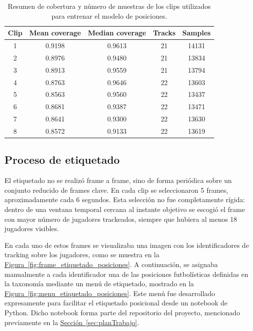 \begin{table}[H]
\centering
\scriptsize
\begin{tabular}{c|c|c|c|c}
\textbf{Clip} & \textbf{Mean coverage} & \textbf{Median coverage} & \textbf{Tracks} & \textbf{Samples} \\
\hline\hline
1 & 0.9198 & 0.9613 & 21 & 14131 \\
\hline
2 & 0.8976 & 0.9480 & 21 & 13834 \\
\hline
3 & 0.8913 & 0.9559 & 21 & 13794 \\
\hline
4 & 0.8763 & 0.9646 & 22 & 13603 \\
\hline
5 & 0.8563 & 0.9560 & 22 & 13437 \\
\hline
6 & 0.8681 & 0.9387 & 22 & 13471 \\
\hline
7 & 0.8641 & 0.9300 & 22 & 13630 \\
\hline
8 & 0.8572 & 0.9133 & 22 & 13619 \\
\hline
\end{tabular}
\caption[Resumen cobertura de clips utilizados]{Resumen de cobertura y número de muestras de los clips utilizados para entrenar el modelo de posiciones.}
\label{tab:position_dataset_clips}
\end{table}

\subsection{Proceso de etiquetado}
\label{subsec:etiquetado-inferencia-posicional}

El etiquetado no se realizó frame a frame, sino de forma periódica sobre un conjunto reducido de frames clave. En cada clip se seleccionaron 5 frames, aproximadamente cada 6 segundos. Esta selección no fue completamente rígida: dentro de una ventana temporal cercana al instante objetivo se escogió el frame con mayor número de jugadores trackeados, siempre que hubiera al menos 18 jugadores visibles.

En cada uno de estos frames se visualizaba una imagen con los identificadores de tracking sobre los jugadores, como se muestra en la \hyperref[fig:frame_etiquetado_posiciones]{Figura~\ref*{fig:frame_etiquetado_posiciones}}. A continuación, se asignaba manualmente a cada identificador una de las posiciones futbolísticas definidas en la taxonomía mediante un menú de etiquetado, mostrado en la \hyperref[fig:menu_etiquetado_posiciones]{Figura~\ref*{fig:menu_etiquetado_posiciones}}. Este menú fue desarrollado expresamente para facilitar el etiquetado posicional desde un notebook de Python. Dicho notebook forma parte del repositorio del proyecto, mencionado previamente en la \hyperref[sec:planTrabajo]{Sección~\ref*{sec:planTrabajo}}.

